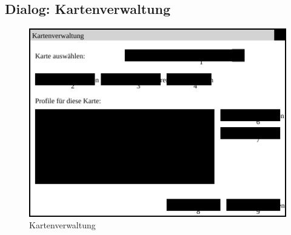 \documentclass[a4paper, 11pt]{article}
\begin{document}
\subsection{Dialog: Kartenverwaltung}
\begin{figure}[H]
\centering
\includegraphics[width=0.9\linewidth]{Kartenverwaltung}
\caption{Kartenverwaltung}
\label{fig:mockupkartenverwaltung}
\end{figure}
\end{document}
